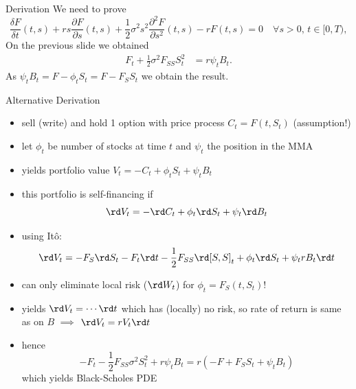 \documentclass[pdf, handout]{beamer}
\begin{document}
\begin{frame}{Derivation}
We need to prove
\[
\frac{\delta F}{\delta t}(t,s) + r s \frac{\partial F}{\partial
s}(t,s) + \frac{1}{2}\sigma^2 s^2 \frac{\partial^2 F}{\partial
s^2}(t,s) -r F(t,s)=0\quad \forall s>0,\,t\in[0, T),
\]
On the previous slide we obtained
\begin{align*}
F_t + \frac{1}{2}\sigma^2 F_{SS} S_t^2    
&=  r\psi_t B_t.
\end{align*}
As $\psi_t B_t = F - \phi_t S_t = F - F_S S_t$
we obtain the result.
\end{frame}



\begin{frame}{Alternative Derivation}
\begin{itemize}
\item sell (write) and hold 1 option with price process
$C_t = F(t, S_t)$  (assumption!)
\item let $\phi_t$ be number of stocks at time $t$ and $\psi_t$ the position in the MMA 
\item yields portfolio value $V_t =  - C_t + \phi_t S_t + \psi_t B_t$
\item this portfolio is self-financing if
\[
\rd V_t =  - \rd C_t  + \phi_t \rd S_t + \psi_t \rd B_t
\]
\item 
using It\^o:
\[
\rd V_t = - F_S \rd S_t - F_t \rd t - \frac{1}{2}F_{SS} \rd [S,S]_t + \phi_t \rd S_t
+ \psi_t r B_t \rd t
\]
\item can only eliminate local risk ($\rd W_t$) for $\phi_t = F_S(t, S_t)$!
\item yields $\rd V_t = \cdots \rd t$  which has (locally) no risk, so
rate of return is same as on $B$ $\implies$ $\rd V_t =r V_t \rd t$
\item hence 
\[
-F_t - \frac{1}{2}F_{SS}\sigma^2 S_t^2 + r\psi_t B_t = r \left(  - F  + F_S S_t + \psi_t B_t
\right)
\]
which yields Black-Scholes PDE
\end{itemize}

\end{frame}
\end{document}
